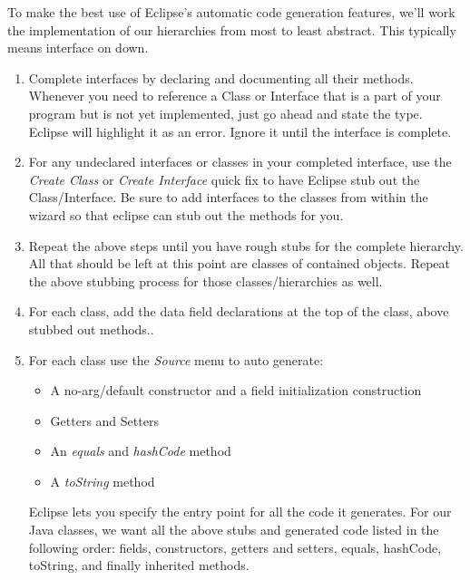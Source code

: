 \documentclass[]{tufte-handout}
\begin{document}
To make the best use of Eclipse's automatic code generation features, we'll work the implementation of our hierarchies from most to least abstract.  This typically means interface on down. 
\begin{enumerate}

\item Complete interfaces by declaring and documenting all their methods. \newline
Whenever you need to reference a Class or Interface that is a part of your program but is not yet implemented, just go ahead and state the type. Eclipse will highlight it as an error. Ignore it until the interface is complete.

\item For any undeclared interfaces or classes in your completed interface, use the \textit{Create Class} or \textit{Create Interface} quick fix to have Eclipse stub out the Class/Interface. Be sure to add interfaces to the classes from within the wizard so that eclipse can stub out the methods for you.

\item Repeat the above steps until you have rough stubs for the complete hierarchy. All that should be left at this point are classes of contained objects. Repeat the above stubbing process for those classes/hierarchies as well. 

\item For each class, add the data field declarations at the top of the class, above stubbed out methods..

\item For each class use the \textit{Source} menu to auto generate:
\begin{itemize}
\item A no-arg/default constructor and a field initialization construction
\item Getters and Setters
\item An \textit{equals} and \textit{hashCode} method
\item A \textit{toString} method
\end{itemize}
Eclipse lets you specify the entry point for all the code it generates. For our Java classes, we want all the above stubs and generated code listed in the following order: fields, constructors, getters and setters, equals, hashCode, toString, and finally inherited methods.  


\end{enumerate}
\end{document}
